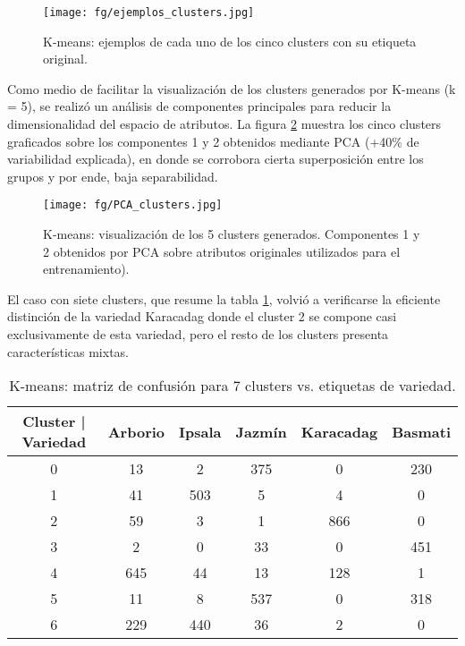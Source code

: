 \documentclass{article}
\begin{document}
\begin{figure} [!htb]
	\centering
	\texttt{[image: fg/ejemplos\_clusters.jpg]}
	\caption{K-means: ejemplos de cada uno de los cinco clusters con su etiqueta original.}	
    \label{fg:ejemplos_clusters}
\end{figure}


Como medio de facilitar la visualización de los clusters generados por K-means (k = 5), se realizó un análisis de componentes principales para reducir la dimensionalidad del espacio de atributos.
La figura \ref{fg:pca} muestra los cinco clusters graficados sobre los componentes 1 y 2 obtenidos mediante PCA (+40\% de variabilidad explicada), en donde se corrobora cierta superposición entre los grupos y por ende, baja separabilidad.

\begin{figure} [!htb]
	\centering
	\texttt{[image: fg/PCA\_clusters.jpg]}
	\caption{K-means: visualización de los 5 clusters generados. Componentes 1 y 2 obtenidos por PCA sobre atributos originales utilizados para el entrenamiento).}	
    \label{fg:pca}
\end{figure}

El caso con siete clusters, que resume la tabla \ref{tab:mc_kmeans7}, volvió a verificarse la eficiente distinción de la variedad Karacadag donde el cluster 2 se compone casi exclusivamente de esta variedad, pero el resto de los clusters presenta características mixtas.

\begin{table}
    \centering
    \begin{tabular}{cccccc}
    \toprule
    Cluster | Variedad &  Arborio&  Ipsala&  Jazmín&  Karacadag& Basmati\\
    \midrule
    0 & 13 & 2 & 375 & 0 & 230 \\
    1 & 41 & 503 & 5 & 4 & 0 \\
    2 & 59 & 3 & 1 & 866 & 0 \\
    3 & 2 & 0 & 33 & 0 & 451 \\
    4 & 645 & 44 & 13& 128 & 1 \\
    5 & 11 & 8 & 537 & 0 & 318 \\
    6 & 229 & 440 & 36 & 2 & 0 \\
    \bottomrule
    \end{tabular}
    \caption{K-means: matriz de confusión para 7 clusters vs. etiquetas de variedad.}
    \label{tab:mc_kmeans7}
\end{table}
\end{document}
